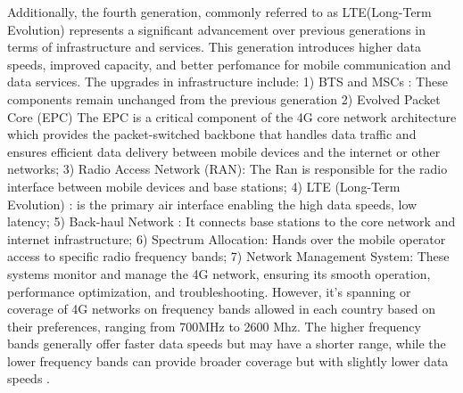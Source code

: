 \documentclass[12pt,a4paper, oneside]{book}
\begin{document}
	   Additionally, the fourth generation, commonly referred to as LTE(Long-Term Evolution) represents a significant advancement over previous generations in terms of infrastructure and services. This generation introduces higher data speeds, improved capacity, and better perfomance for mobile communication and data services. The upgrades in infrastructure include: 1) BTS and MSCs : These components remain unchanged from the previous generation 2) Evolved Packet Core (EPC)  The EPC is a critical component of the 4G core network architecture which provides the packet-switched backbone that handles data traffic and ensures efficient data delivery between mobile devices and the internet or other networks; 3)  Radio Access Network (RAN): The Ran is responsible for the radio interface between mobile devices and base stations; 4) LTE (Long-Term Evolution) :  is the primary air interface enabling the high data speeds, low latency; 5) Back-haul Network : It connects base stations to the core network and internet infrastructure; 6) Spectrum Allocation: Hands over the mobile operator access to specific radio frequency bands; 7) Network Management System: These systems monitor and manage the 4G network, ensuring its smooth operation, performance optimization, and troubleshooting.
	   However, it's spanning or coverage of 4G networks on frequency bands allowed in each country based on their preferences, ranging from 700MHz to 2600 Mhz. The higher frequency bands generally offer faster data speeds but may have a shorter range, while the lower frequency bands can provide broader coverage but with slightly lower data speeds \cite{mishra2007advanced}.
\end{document}
